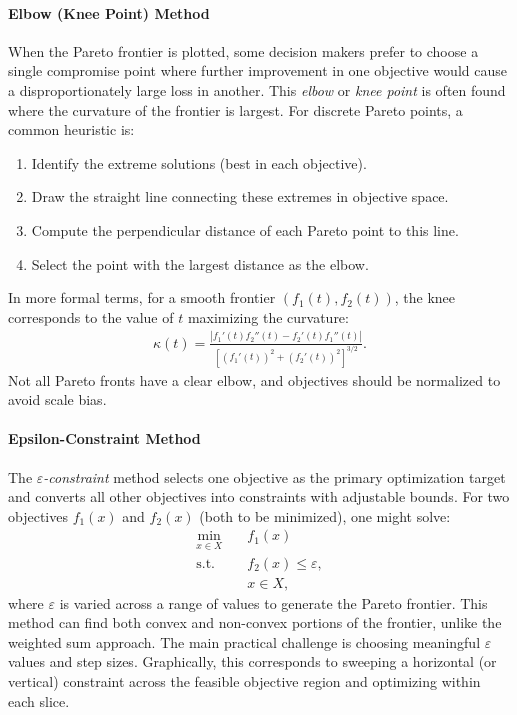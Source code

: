 \paragraph{Elbow (Knee Point) Method}
When the Pareto frontier is plotted, some decision makers prefer to choose a single compromise point where further improvement in one objective would cause a disproportionately large loss in another. This \emph{elbow} or \emph{knee point} is often found where the curvature of the frontier is largest. 
For discrete Pareto points, a common heuristic is:
\begin{enumerate}
    \item Identify the extreme solutions (best in each objective).
    \item Draw the straight line connecting these extremes in objective space.
    \item Compute the perpendicular distance of each Pareto point to this line.
    \item Select the point with the largest distance as the elbow.
\end{enumerate}
In more formal terms, for a smooth frontier $(f_1(t), f_2(t))$, the knee corresponds to the value of $t$ maximizing the curvature:
\begin{align*}
\kappa(t) = \frac{|f_1'(t) f_2''(t) - f_2'(t) f_1''(t)|}{\left[ (f_1'(t))^2 + (f_2'(t))^2 \right]^{3/2}}.
\end{align*}
Not all Pareto fronts have a clear elbow, and objectives should be normalized to avoid scale bias.
\paragraph{Epsilon-Constraint Method}
The \emph{$\varepsilon$-constraint} method selects one objective as the primary optimization target and converts all other objectives into constraints with adjustable bounds. 
For two objectives $f_1(x)$ and $f_2(x)$ (both to be minimized), one might solve:
\begin{align*}
\min_{x \in X} \quad & f_1(x) \\
\text{s.t.} \quad & f_2(x) \le \varepsilon, \\
& x \in X,
\end{align*}
where $\varepsilon$ is varied across a range of values to generate the Pareto frontier. This method can find both convex and non-convex portions of the frontier, unlike the weighted sum approach. The main practical challenge is choosing meaningful $\varepsilon$ values and step sizes. 
Graphically, this corresponds to sweeping a horizontal (or vertical) constraint across the feasible objective region and optimizing within each slice.
